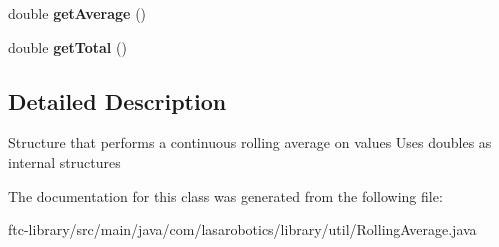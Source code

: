 \begin{DoxyCompactItemize}
\item 
\hypertarget{classcom_1_1lasarobotics_1_1library_1_1util_1_1_rolling_average_a227073b1b13ce0a4835623ebebfa4438}{}double {\bfseries get\+Average} ()\label{classcom_1_1lasarobotics_1_1library_1_1util_1_1_rolling_average_a227073b1b13ce0a4835623ebebfa4438}

\item 
\hypertarget{classcom_1_1lasarobotics_1_1library_1_1util_1_1_rolling_average_a0402a4b403f9f8af9781115568c12813}{}double {\bfseries get\+Total} ()\label{classcom_1_1lasarobotics_1_1library_1_1util_1_1_rolling_average_a0402a4b403f9f8af9781115568c12813}

\end{DoxyCompactItemize}


\subsection{Detailed Description}
Structure that performs a continuous rolling average on values Uses doubles as internal structures 

The documentation for this class was generated from the following file\+:\begin{DoxyCompactItemize}
\item 
ftc-\/library/src/main/java/com/lasarobotics/library/util/Rolling\+Average.\+java\end{DoxyCompactItemize}
